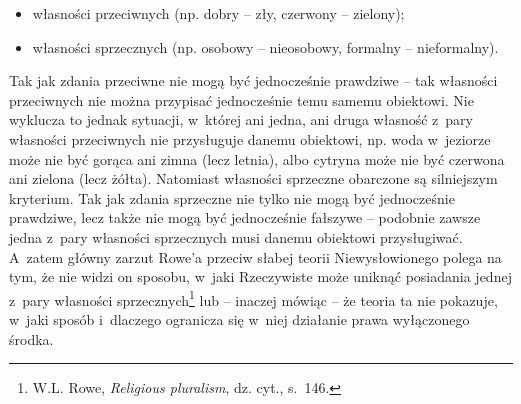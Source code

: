\begin{itemize}
\item własności przeciwnych (np. dobry -- zły, czerwony -- zielony);
\item własności sprzecznych (np. osobowy -- nieosobowy, formalny -- nieformalny).
\end{itemize}
Tak jak zdania przeciwne nie mogą być jednocześnie prawdziwe -- tak własności przeciwnych nie można przypisać jednocześnie temu samemu obiektowi. Nie wyklucza to jednak sytuacji, w~której ani jedna, ani druga własność z~pary własności przeciwnych nie przysługuje danemu obiektowi, np. woda w~jeziorze może nie być gorąca ani zimna (lecz letnia), albo cytryna może nie być czerwona ani zielona (lecz żółta). Natomiast własności sprzeczne obarczone są silniejszym kryterium. Tak jak zdania sprzeczne nie tylko nie mogą być jednocześnie prawdziwe, lecz także nie mogą być jednocześnie fałszywe -- podobnie zawsze jedna z~pary własności sprzecznych musi danemu obiektowi przysługiwać. A~zatem główny zarzut Rowe'a przeciw słabej teorii Niewysłowionego polega na tym, że nie widzi on sposobu, w~jaki Rzeczywiste może uniknąć posiadania jednej z~pary własności sprzecznych\footnote{W.L. Rowe, \textit{Religious pluralism}, dz. cyt., s.~146.} lub -- inaczej mówiąc -- że teoria ta nie pokazuje, w~jaki sposób i~dlaczego ogranicza się w~niej działanie prawa wyłączonego środka.


